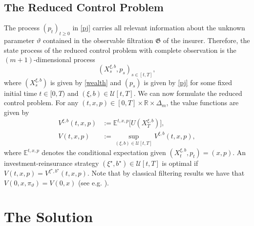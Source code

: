 \documentclass[reqno, 11pt]{amsart}%
\newcommand{\R}{\mathbb{R}}
\newcommand{\Eop}{\mathbb{E}}
\newcommand{\Pop}{\mathbb{P}}
\newcommand{\xib}{(\xi,b)}
\theoremstyle{definition}
\numberwithin{equation}{section} \numberwithin{theorem}{section}
\begin{document}
\subsection{The Reduced Control Problem}
The process $(p_t)_{t\ge0}$ in \eqref{pj} carries all relevant information about the unknown parameter $\vartheta$ contained in the observable filtration ${\mathfrak G}$ of the insurer.  Therefore, the state process of the reduced control problem with complete observation is the $(m+1)$-dimensional process
\begin{equation*}
(X^{\xi,b}_s,p_s)_{s\in[t,T]},
\end{equation*}
where $(X^{\xi,b}_s)$ is given by \eqref{wealth} and $(p_s)$ is given by \eqref{pj} for some fixed initial time $t\in[0,T)$ and $\xib\in{\mathcal U}[t,T]$. 
We can now formulate the reduced control problem. For any $(t,x,p)\in[0,T]\times\R\times\Delta_m$, the value functions are given by
\begin{equation}\label{P} \tag{P}
\begin{aligned}
V^{\xi,b}(t,x,p) &:= \Eop^{t,x,p}\big[U(X^{\xi,b}_T)\big],\\
V(t,x,p) &:= \sup_{(\xi,b)\in{\mathcal U}[t,T]}V^{\xi,b}(t,x,p),
\end{aligned}
\end{equation}
where $ \Eop^{t,x,p}$ denotes the conditional expectation given $(X^{\xi,b}_t,p_t)=(x,p)$. An investment-reinsurance strategy $(\xi^\star,b^\star)\in{\mathcal U}[t,T]$ is optimal if
$V(t,x,p) = V^{\xi^\star,b^\star}(t,x,p).$
Note that by classical filtering results we have that $V(0,x,\pi_\vartheta)=V(0,x)$
(see e.g. \cite{BaeuerleRieder2007}).



\section{The Solution}\label{sec:sol}
\end{document}
